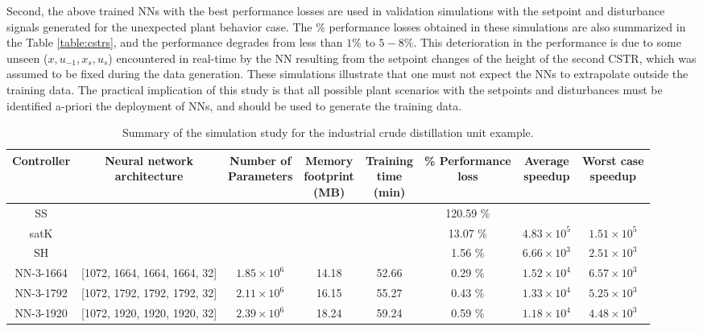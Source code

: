 \documentclass[preprint,5p, twocolumn, authoryear]{elsarticle}
\begin{document}
Second, the above trained NNs with the best performance losses are used in
validation simulations with the setpoint and disturbance signals generated for
the unexpected plant behavior case. The $\%$ performance losses obtained in
these simulations are also summarized in the Table \ref{table:cstrs}, and the
performance degrades from less than $1\%$ to $5-8\%$. This deterioration in the
performance is due to some unseen ($x, u_{-1}, x_s, u_s$) encountered in
real-time by the NN resulting from the setpoint changes of the height of the
second CSTR, which was assumed to be fixed during the data generation. These
simulations illustrate that one must not expect the NNs to extrapolate outside
the training data. The practical implication of this study is that all possible
plant scenarios with the setpoints and disturbances must be identified a-priori
the deployment of NNs, and should be used to generate the training data.

\begin{table}[t]
    \caption{Summary of the simulation study for the industrial crude
    distillation unit example.}
\begin{tabular}{ |c|c|c|c|c|c|c|c| }
          \hline
          Controller & \thead{Neural network \\ architecture} & \thead{Number of
          \\ Parameters} & \thead{Memory \\ footprint \\ (MB)} & \thead{Training
          \\ time \\ (min)} & \thead{\% Performance\\ loss} & \thead{Average \\
          speedup} & \thead{Worst case \\ speedup} \\
          \hline
      SS &  &  & &  & 120.59 \% &  & \\ 
  satK &  &  &   &  & 13.07 \% & $4.83 \times 10^5$ & $1.51 \times 10^5$ \\ 
  SH &  &  &  &  & 1.56 \% & $6.66 \times 10^3$  & $2.51 \times 10^3$ \\ 
  NN-3-1664 & [1072, 1664, 1664, 1664, 32] & $1.85 \times 10^6$ & 14.18 & 52.66
  & 0.29 \% & $1.52 \times 10^4$ & $6.57 \times 10^3$  \\ 
  NN-3-1792 & [1072, 1792, 1792, 1792, 32]  & $2.11 \times 10^6$ & 16.15  &
  55.27 & 0.43 \% & $1.33 \times 10^4$ & $5.25 \times 10^3$ \\ 
  NN-3-1920 & [1072, 1920, 1920, 1920, 32]  & $2.39 \times 10^6$ & 18.24  &
  59.24 & 0.59 \% & $1.18 \times 10^4$ & $4.48 \times 10^3$ \\ 
\hline
\end{tabular}
\label{table:cdu}      
\end{table}
\end{document}
